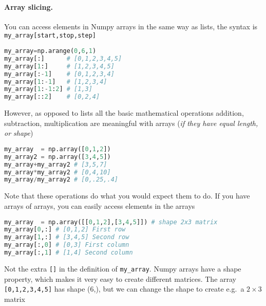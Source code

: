 \documentclass[graybox,sectrefs,envcountresetchap,open=right,final]{svmonodo}
\begin{document}
\paragraph{Array slicing.}
You can access elements in Numpy arrays in the same way as lists, the syntax is \Verb!my_array[start,stop,step]!








\begin{lstlisting}[language=python,style=blue1bar]
my_array=np.arange(0,6,1)
my_array[:]      # [0,1,2,3,4,5]
my_array[1:]     # [1,2,3,4,5]
my_array[:-1]    # [0,1,2,3,4]
my_array[1:-1]   # [1,2,3,4]
my_array[1:-1:2] # [1,3]
my_array[::2]    # [0,2,4]

\end{lstlisting}

However, as opposed to lists all the basic mathematical operations addition, subtraction, multiplication are meaningful with arrays (\emph{if they have equal length, or shape})






\begin{lstlisting}[language=Python,style=gray]
my_array  = np.array([0,1,2])
my_array2 = np.array([3,4,5])
my_array+my_array2 # [3,5,7]
my_array*my_array2 # [0,4,10]
my_array/my_array2 # [0,.25,.4]

\end{lstlisting}

Note that these operations do what you would expect them to do. If you have arrays of arrays, you can easily access elements in the arrays






\begin{lstlisting}[language=Python,style=gray]
my_array  = np.array([[0,1,2],[3,4,5]]) # shape 2x3 matrix
my_array[0,:] # [0,1,2] First row
my_array[1,:] # [3,4,5] Second row
my_array[:,0] # [0,3] First column
my_array[:,1] # [1,4] Second column

\end{lstlisting}

Not the extra \texttt{[]} in the definition of \Verb!my_array!.  Numpy arrays have a shape property, which makes it very easy to create different matrices. The array \texttt{[0,1,2,3,4,5]} has shape (6,), but we can change the shape to create e.g.~a $2\times3$ matrix
\end{document}
